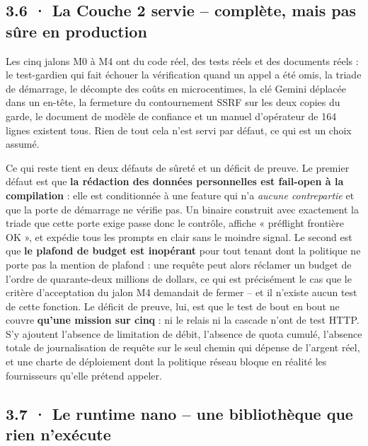 \documentclass[10pt]{article}
\begin{document}
\subsection{3.6 · La Couche 2 servie -- complète, mais pas sûre en production}

Les cinq jalons M0 à M4 ont du code réel, des tests réels et des documents réels : le test-gardien qui
fait échouer la vérification quand un appel a été omis, la triade de démarrage, le décompte des coûts en
microcentimes, la clé Gemini déplacée dans un en-tête, la fermeture du contournement SSRF sur les deux
copies du garde, le document de modèle de confiance et un manuel d'opérateur de 164 lignes existent
tous. Rien de tout cela n'est servi par défaut, ce qui est un choix assumé.

Ce qui reste tient en deux défauts de sûreté et un déficit de preuve. Le premier défaut est que
\textbf{la rédaction des données personnelles est fail-open à la compilation} : elle est conditionnée à
une feature qui n'a \emph{aucune contrepartie} et que la porte de démarrage ne vérifie pas. Un binaire
construit avec exactement la triade que cette porte exige passe donc le contrôle, affiche « préflight
frontière OK », et expédie tous les prompts en clair sans le moindre signal. Le second est que
\textbf{le plafond de budget est inopérant} pour tout tenant dont la politique ne porte pas la mention
de plafond : une requête peut alors réclamer un budget de l'ordre de quarante-deux millions de dollars,
ce qui est précisément le cas que le critère d'acceptation du jalon M4 demandait de fermer -- et il
n'existe aucun test de cette fonction. Le déficit de preuve, lui, est que le test de bout en bout ne
couvre \textbf{qu'une mission sur cinq} : ni le relais ni la cascade n'ont de test HTTP. S'y ajoutent
l'absence de limitation de débit, l'absence de quota cumulé, l'absence totale de journalisation de
requête sur le seul chemin qui dépense de l'argent réel, et une charte de déploiement dont la politique
réseau bloque en réalité les fournisseurs qu'elle prétend appeler.

\subsection{3.7 · Le runtime nano -- une bibliothèque que rien n'exécute}
\end{document}
